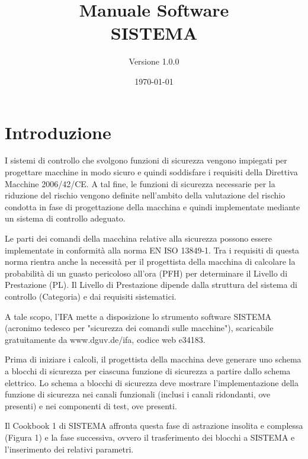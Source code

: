 \documentclass[a4paper,11pt]{article}
\title{Manuale Software\\ SISTEMA}
\author{Versione 1.0.0}
\date{\today}
\begin{document}
	
	\maketitle
    \newpage

	\tableofcontents		
	\clearpage
	
	\section{Introduzione}	

    \par\medskip\noindent
    I sistemi di controllo che svolgono funzioni di sicurezza vengono impiegati per progettare macchine in modo sicuro e quindi soddisfare i requisiti della Direttiva Macchine 2006/42/CE. A tal fine, le funzioni di sicurezza necessarie per la riduzione del rischio vengono definite nell'ambito della valutazione del rischio condotta in fase di progettazione della macchina e quindi implementate mediante un sistema di controllo adeguato.
    \par\medskip\noindent Le parti dei comandi della macchina relative alla sicurezza possono essere implementate in conformità alla norma EN ISO 13849-1. Tra i requisiti di questa norma rientra anche la necessità per il progettista della macchina di calcolare la probabilità di un guasto pericoloso all'ora (PFH) per determinare il Livello di Prestazione (PL). Il Livello di Prestazione dipende dalla struttura del sistema di controllo (Categoria) e dai requisiti sistematici.
    \par\medskip\noindent
    A tale scopo, l'IFA mette a disposizione lo strumento software SISTEMA (acronimo tedesco per "sicurezza dei comandi sulle macchine"), scaricabile gratuitamente da www.dguv.de/ifa, codice web e34183.
    \par\medskip\noindent
    Prima di iniziare i calcoli, il progettista della macchina deve generare uno schema a blocchi di sicurezza per ciascuna funzione di sicurezza a partire dallo schema elettrico. Lo schema a blocchi di sicurezza deve mostrare l'implementazione della funzione di sicurezza nei canali funzionali (inclusi i canali ridondanti, ove presenti) e nei componenti di test, ove presenti.
    \par\medskip\noindent
    Il Cookbook 1 di SISTEMA affronta questa fase di astrazione insolita e complessa (Figura 1) e la fase successiva, ovvero il trasferimento dei blocchi a SISTEMA e l'inserimento dei relativi parametri.
\end{document}
